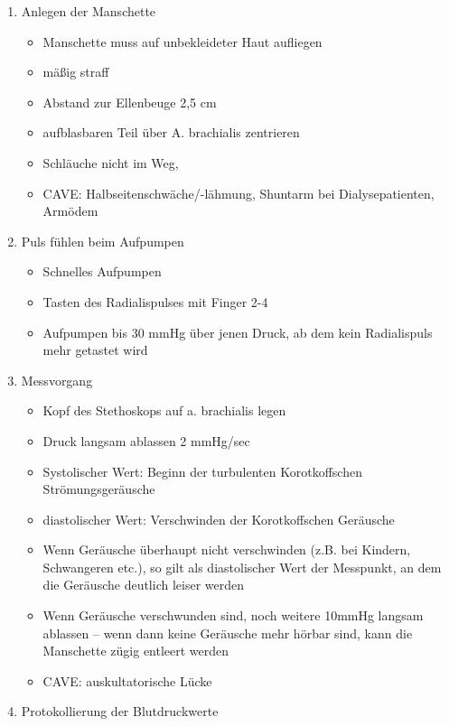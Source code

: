 \begin{enumerate}
    \item Anlegen der Manschette
    \begin{itemize}
        \item Manschette muss auf unbekleideter Haut aufliegen
        \item m\"a{\ss}ig straff
        \item Abstand zur Ellenbeuge 2,5 cm
        \item aufblasbaren Teil \"uber A. brachialis zentrieren
        \item Schl\"auche nicht im Weg,
        \item CAVE: Halbseitenschw\"ache/-l\"ahmung, Shuntarm bei
        Dialysepatienten, Arm\"odem
    \end{itemize}
    \item Puls f\"uhlen beim Aufpumpen
    \begin{itemize}
        \item Schnelles Aufpumpen
        \item Tasten des Radialispulses mit Finger 2-4
        \item Aufpumpen bis 30 mmHg \"uber jenen Druck, ab dem kein Radialispuls
        mehr getastet wird
    \end{itemize}
    \item Messvorgang
    \begin{itemize}
        \item Kopf des Stethoskops auf a. brachialis legen
        \item Druck langsam ablassen 2 mmHg/sec
        \item Systolischer Wert: Beginn der turbulenten Korotkoffschen
        Str\"omungsger\"ausche
        \item diastolischer Wert: Verschwinden der Korotkoffschen Ger\"ausche
        \item Wenn Ger\"ausche \"uberhaupt nicht verschwinden (z.B. bei Kindern,
        Schwangeren etc.), so gilt als diastolischer Wert der Messpunkt, an dem
        die Ger\"ausche deutlich leiser werden
        \item Wenn Ger\"ausche verschwunden sind, noch weitere 10mmHg langsam
        ablassen -- wenn dann keine Ger\"ausche mehr h\"orbar sind, kann die
        Manschette z\"ugig entleert werden
        \item CAVE: auskultatorische L\"ucke
    \end{itemize}
    \item Protokollierung der Blutdruckwerte
\end{enumerate}


